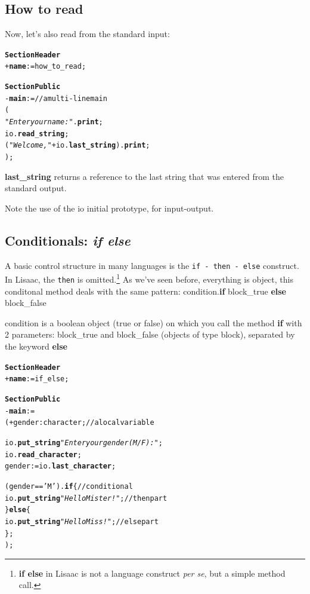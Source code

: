 \documentclass[11pt]{mybook}
\begin{document}
\subsection{How to read}
\label{quickstart:write:read}
%
Now, let's also read from the standard input:

\begin{alltt} 
{\bf{}Section Header}
  + {\bf{}name} := {\sc{}how\_to\_read};
      
{\bf{}Section Public}
  - {\bf{}main} :=           // a multi-line main
    (
      {\it{}"Enter your name : "}.{\bf{}print};
      {\sc{}io}.{\bf{}read}{\tt{}_}{\bf{}string};
      ({\it{}"Welcome, "} + {\sc{}io}.{\bf{}last\_string}).{\bf{}print};
    );
\end{alltt}

{\bf{}last\_string} returns a reference to the last string that was
entered from the standard output.

Note the use of the {\sc{}io} initial prototype, for input-output.

\subsection{Conditionals: {\it{}if else}}
\label{quickstart:write:conditionals}
%
A basic control structure in many languages is the {\tt if - then -
else} construct. 
In Lisaac, the {\tt then} is omitted.\footnote{{\bf{}if else} in Lisaac is not a language
construct {\it{}per se}, but a simple method call.}
As we've seen before, everything is object, this conditonal method deals with the same pattern:
condition.{\bf{}if} block\_true {\bf{}else} block\_false

condition is a {\sc{}boolean} object (true or false) on which you call the method {\bf{}if} with 2 parameters:
block\_true and block\_false (objects of type {\sc{}block}), separated by the keyword {\bf{}else} 


\begin{alltt} 
{\bf{}Section Header}
  + {\bf{}name} := {\sc{}if\_else};
     
{\bf{}Section Public}
  - {\bf{}main} := 
    ( + gender:{\sc{}character};   // a local variable
   
      {\sc{}io}.{\bf{}put\_string} {\it{}"Enter your gender (M/F) : "};
      {\sc{}io}.{\bf{}read}{\tt{}_}{\bf{}character};
      gender := {\sc{}io}.{\bf{}last}{\tt{}_}{\bf{}character};

      (gender == 'M').{\bf{}if} \{     // conditional
        {\sc{}io}.{\bf{}put\_string} {\it{}"Hello Mister !"};   // then part
      \} {\bf{}else} \{
        {\sc{}io}.{\bf{}put\_string} {\it{}"Hello Miss !"};  // else part
      \};
    );
\end{alltt}
\end{document}
